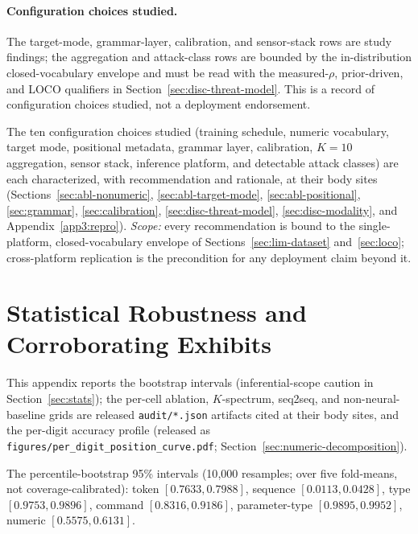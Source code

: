 \documentclass[sensors,article,submit,moreauthors,pdftex]{Definitions/mdpi}
\begin{document}
\paragraph{Configuration choices studied.}  The target-mode, grammar-layer, calibration, and sensor-stack rows are study findings; the aggregation and attack-class rows are bounded by the in-distribution closed-vocabulary envelope and must be read with the measured-$\rho$, prior-driven, and LOCO qualifiers in Section~\ref{sec:disc-threat-model}. This is a record of configuration choices studied, not a deployment endorsement.

The ten configuration choices studied (training schedule, numeric vocabulary, target mode, positional metadata, grammar layer, calibration, $K\!=\!10$ aggregation, sensor stack, inference platform, and detectable attack classes) are each characterized, with recommendation and rationale, at their body sites (Sections~\ref{sec:abl-nonumeric}, \ref{sec:abl-target-mode}, \ref{sec:abl-positional}, \ref{sec:grammar}, \ref{sec:calibration}, \ref{sec:disc-threat-model}, \ref{sec:disc-modality}, and Appendix~\ref{app3:repro}). \emph{Scope:} every recommendation is bound to the single-platform, closed-vocabulary envelope of Sections~\ref{sec:lim-dataset} and~\ref{sec:loco}; cross-platform replication is the precondition for any deployment claim beyond it.

\section{Statistical Robustness and Corroborating Exhibits}
\label{app3:stats}

This appendix reports the bootstrap intervals (inferential-scope caution in Section~\ref{sec:stats}); the per-cell ablation, $K$-spectrum, seq2seq, and non-neural-baseline grids are released \texttt{audit/*.json} artifacts cited at their body sites, and the per-digit accuracy profile (released as \texttt{figures/per\_digit\_position\_curve.pdf}; Section~\ref{sec:numeric-decomposition}).

The percentile-bootstrap 95\% intervals (10{,}000 resamples; over five fold-means, not coverage-calibrated): token $[0.7633, 0.7988]$, sequence $[0.0113, 0.0428]$, type $[0.9753, 0.9896]$, command $[0.8316, 0.9186]$, parameter-type $[0.9895, 0.9952]$, numeric $[0.5575, 0.6131]$.



\end{document}
